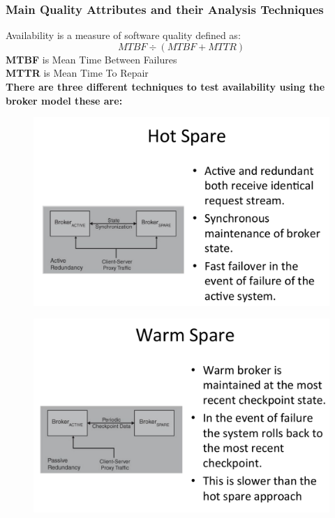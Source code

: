 \documentclass[a4paper]{article}
\begin{document}
\subsubsection{Main Quality Attributes and their Analysis Techniques}

Availability is a measure of software quality defined as:
 $$MTBF \div (MTBF + MTTR)$$
\textbf{MTBF} is Mean Time Between Failures\\
\textbf{MTTR} is Mean Time To Repair\\

\textbf{There are three different techniques to test availability using the broker model these are:}

\begin{figure}[H]
  \includegraphics[scale=0.4]{images/hot-spare.png}
\end{figure}

\begin{figure}[H]
  \includegraphics[scale=0.4]{images/warm-spare.png}
\end{figure}
\end{document}
